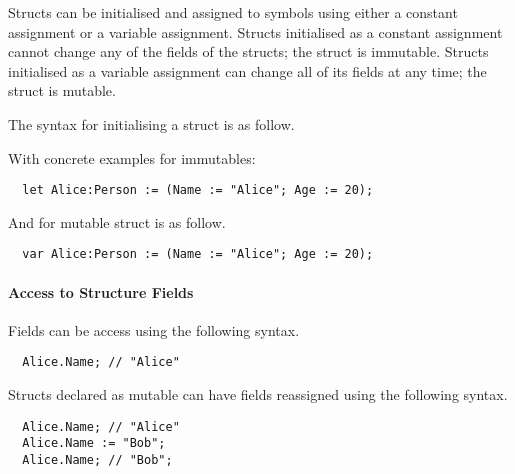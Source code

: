 Structs can be initialised and assigned to symbols using either a constant assignment or a variable assignment. Structs initialised as a constant assignment cannot change any of the fields of the structs; the struct is immutable. Structs initialised as a variable assignment can change all of its fields at any time; the struct is mutable.

The syntax for initialising a struct is as follow.


With concrete examples for immutables:

\begin{verbatim}
  let Alice:Person := (Name := "Alice"; Age := 20);
\end{verbatim}

And for mutable struct is as follow.

\begin{verbatim}
  var Alice:Person := (Name := "Alice"; Age := 20);
\end{verbatim}

\paragraph{Access to Structure Fields}
\label{sec:accessStructFields}

Fields can be access using the following syntax.

\begin{verbatim}
  Alice.Name; // "Alice"
\end{verbatim}

Structs declared as mutable can have fields reassigned using the following syntax.

\begin{verbatim}
  Alice.Name; // "Alice"
  Alice.Name := "Bob";
  Alice.Name; // "Bob";
\end{verbatim}
